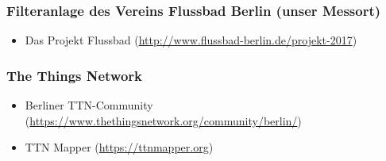 \subsubsection*{Filteranlage des Vereins Flussbad Berlin (unser Messort)}
\begin{itemize}[noitemsep]
	\item Das Projekt Flussbad (\url{http://www.flussbad-berlin.de/projekt-2017})
\end{itemize}

\subsubsection*{The Things Network}
\begin{itemize}[noitemsep]
	\item Berliner TTN-Community (\url{https://www.thethingsnetwork.org/community/berlin/})
	\item TTN Mapper (\url{https://ttnmapper.org})
\end{itemize}

\newpage
